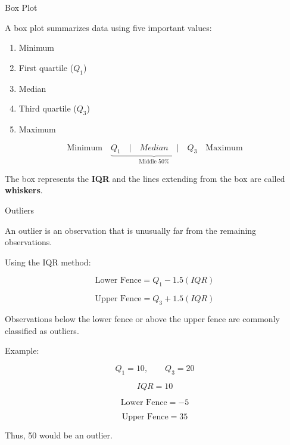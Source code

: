 \documentclass[aspectratio=169]{beamer}
\begin{document}
\begin{frame}{Box Plot}

A box plot summarizes data using five important values:

\begin{enumerate}
    \item Minimum
    \item First quartile ($Q_1$)
    \item Median
    \item Third quartile ($Q_3$)
    \item Maximum
\end{enumerate}

\begin{center}
\[
\text{Minimum}
\quad
\underbrace{
\boxed{
Q_1\quad|\quad Median\quad|\quad Q_3
}
}_{\text{Middle 50\%}}
\quad
\text{Maximum}
\]
\end{center}

The box represents the \textbf{IQR} and the lines extending from
the box are called \textbf{whiskers}.
\end{frame}

\begin{frame}{Outliers}

An outlier is an observation that is unusually far from the
remaining observations.

Using the IQR method:

\[
\boxed{
\text{Lower Fence}=Q_1-1.5(IQR)
}
\]

\[
\boxed{
\text{Upper Fence}=Q_3+1.5(IQR)
}
\]

Observations below the lower fence or above the upper fence
are commonly classified as outliers.

\vspace{0.3cm}

Example:

\[
Q_1=10,\qquad Q_3=20
\]

\[
IQR=10
\]

\[
\text{Lower Fence}=-5
\]

\[
\text{Upper Fence}=35
\]

Thus, 50 would be an outlier.
\end{frame}
\end{document}
